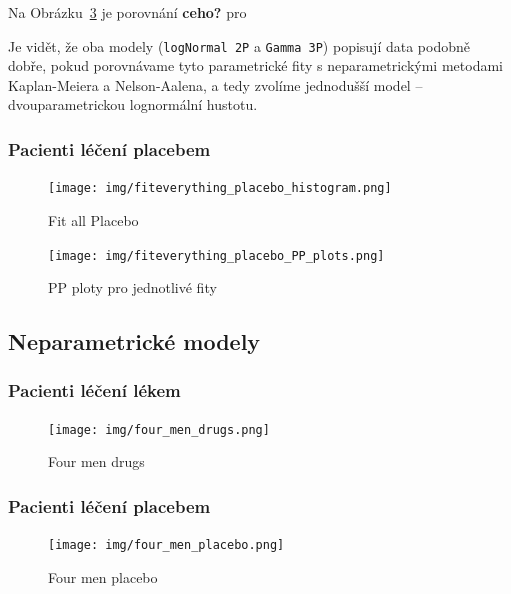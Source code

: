 \documentclass[a4, 11pt]{article}
\newcommand{\commm}[1]{{\textcolor[cmyk]{0,1,0,0}{\textbf{\textsf{#1}}}}}      %
\theoremstyle{definition}
\theoremstyle{remark}
\begin{document}
	Na Obrázku~\ref{fig:four_men_drugs} je porovnání \commm{ceho?} pro
	
	Je vidět, že oba modely (\texttt{logNormal 2P} a \texttt{Gamma 3P}) popisují data podobně dobře, pokud porovnávame tyto parametrické fity s neparametrickými metodami Kaplan-Meiera a Nelson-Aalena, a tedy zvolíme jednodušší model -- dvouparametrickou lognormální hustotu.
	
	
	
	\subsubsection{Pacienti léčení placebem} \label{sec:parametric_placebo}
	
	\begin{figure}[H]
		\centering
		\texttt{[image: img/fiteverything\_placebo\_histogram.png]}
		\caption{Fit all Placebo}
		\label{fig:fit_everything_hist_placebo}
	\end{figure}

	\begin{figure}[H]
		\centering
		\texttt{[image: img/fiteverything\_placebo\_PP\_plots.png]}
		\caption{PP ploty pro jednotlivé fity}
		\label{fig:fit_everything_placebo_PP_plots}
	\end{figure}
	
	\subsection{Neparametrické modely}
	
	\subsubsection{Pacienti léčení lékem} \label{sec:non_parametric_drugs}
	
	\begin{figure}[H]
		\centering
		\texttt{[image: img/four\_men\_drugs.png]}
		\caption{Four men drugs}
		\label{fig:four_men_drugs}
	\end{figure}
	
	\subsubsection{Pacienti léčení placebem} \label{sec:non_parametric_placebo}
	
	\begin{figure}[H]
		\centering
		\texttt{[image: img/four\_men\_placebo.png]}
		\caption{Four men placebo}
		\label{fig:four_men_placebo}
	\end{figure}
\end{document}
